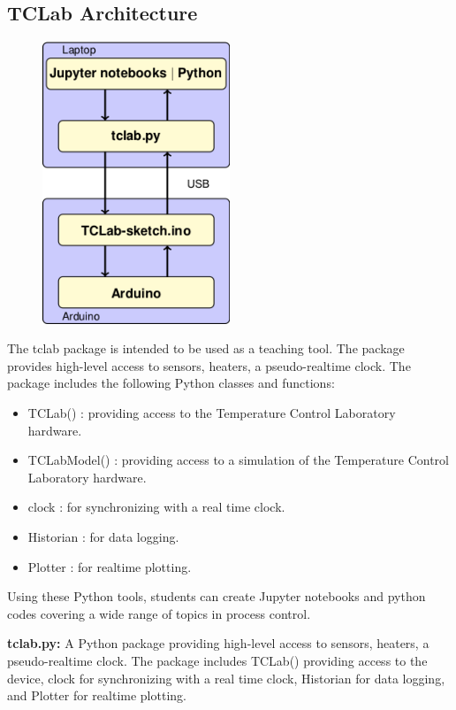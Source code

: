 \subsection{TCLab Architecture}

\begin{figure} 
    \centering
    \includegraphics[width=0.5\textwidth]{TCLabOverview2.png}
\end{figure}

The tclab package is intended to be used as a teaching tool. The package provides high-level access to sensors, heaters, a pseudo-realtime clock. The package includes the following Python classes and functions:

\begin{itemize}
    \item TCLab() : providing access to the Temperature Control Laboratory hardware.
    \item TCLabModel() : providing access to a simulation of the Temperature Control Laboratory hardware.
    \item clock : for synchronizing with a real time clock.
    \item     Historian : for data logging.
    \item     Plotter : for realtime plotting.


\end{itemize}

    Using these Python tools, students can create Jupyter notebooks and python codes covering a wide range of topics in process control.

    \textbf{tclab.py:} A Python package providing high-level access to sensors, heaters, a pseudo-realtime clock. The package includes TCLab() providing access to the device, clock for synchronizing with a real time clock, Historian for data logging, and Plotter for realtime plotting. 

